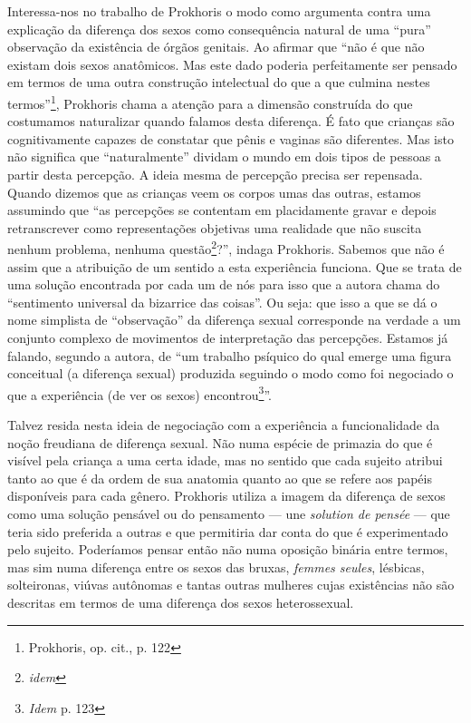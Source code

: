 Interessa-nos no trabalho de Prokhoris o modo como argumenta contra uma
explicação da diferença dos sexos como consequência natural de uma
``pura'' observação da existência de órgãos genitais. Ao afirmar que
``não é que não existam dois sexos anatômicos. Mas este dado poderia
perfeitamente ser pensado em termos de uma outra construção intelectual
do que a que culmina nestes termos''\footnote{Prokhoris, op. cit., p.
  122}, Prokhoris chama a atenção para a dimensão construída do que
costumamos naturalizar quando falamos desta diferença. É fato que
crianças são cognitivamente capazes de constatar que pênis e vaginas são
diferentes. Mas isto não significa que ``naturalmente'' dividam o mundo
em dois tipos de pessoas a partir desta percepção. A ideia mesma de
percepção precisa ser repensada. Quando dizemos que as crianças veem os
corpos umas das outras, estamos assumindo que ``as percepções se
contentam em placidamente gravar e depois retranscrever como
representações objetivas uma realidade que não suscita nenhum problema,
nenhuma questão\footnote{\emph{idem}}?'', indaga Prokhoris. Sabemos que
não é assim que a atribuição de um sentido a esta experiência funciona.
Que se trata de uma solução encontrada por cada um de nós para isso que
a autora chama do ``sentimento universal da bizarrice das coisas''. Ou
seja: que isso a que se dá o nome simplista de ``observação'' da
diferença sexual corresponde na verdade a um conjunto complexo de
movimentos de interpretação das percepções. Estamos já falando, segundo
a autora, de ``um trabalho psíquico do qual emerge uma figura conceitual
(a diferença sexual) produzida seguindo o modo como foi negociado o que
a experiência (de ver os sexos) encontrou\footnote{\emph{Idem} p. 123}''.

Talvez resida nesta ideia de negociação com a experiência a
funcionalidade da noção freudiana de diferença sexual. Não numa espécie
de primazia do que é visível pela criança a uma certa idade, mas no
sentido que cada sujeito atribui tanto ao que é da ordem de sua anatomia
quanto ao que se refere aos papéis disponíveis para cada gênero.
Prokhoris utiliza a imagem da diferença de sexos como uma solução
pensável ou do pensamento --- une \emph{solution de pensée} --- que teria
sido preferida a outras e que permitiria dar conta do que é
experimentado pelo sujeito. Poderíamos pensar então não numa oposição
binária entre termos, mas sim numa diferença entre os sexos das bruxas,
\emph{femmes seules}, lésbicas, solteironas, viúvas autônomas e tantas
outras mulheres cujas existências não são descritas em termos de uma
diferença dos sexos heterossexual.

